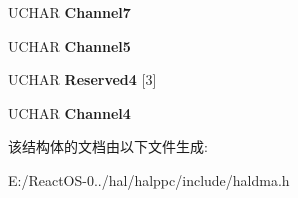 \begin{DoxyCompactItemize}
U\+C\+H\+AR {\bfseries Channel7}
\item 
\mbox{\label{struct___d_m_a___p_a_g_e_a306d23515e071c03688ac06e40590607}} 
U\+C\+H\+AR {\bfseries Channel5}
\item 
\mbox{\label{struct___d_m_a___p_a_g_e_a0bc6eea433144ccdb26ddf1fc03eaedd}} 
U\+C\+H\+AR {\bfseries Reserved4} \mbox{[}3\mbox{]}
\item 
\mbox{\label{struct___d_m_a___p_a_g_e_a3a5238a0634c4d6472f7693c61c3b16f}} 
U\+C\+H\+AR {\bfseries Channel4}
\end{DoxyCompactItemize}


该结构体的文档由以下文件生成\+:\begin{DoxyCompactItemize}
\item 
E\+:/\+React\+O\+S-\/0../hal/halppc/include/haldma.\+h\end{DoxyCompactItemize}
